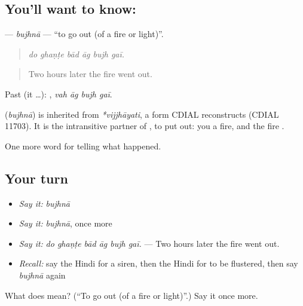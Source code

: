 \subsection*{You'll want to know: }
\textbf{} — \emph{bujhnā} — \textquotedblleft{}to go out (of a fire or light)\textquotedblright{}.

\begin{quote}
     
\end{quote}

\begin{quote}
\emph{do ghaṇṭe bād āg bujh gaī.}
\end{quote}

\begin{quote}
Two hours later the fire went out.
\end{quote}

Past (it …):    , \emph{vah āg bujh gaī}.

\begin{cousinweb}
\textbf{} (\emph{bujhnā}) is inherited from \emph{*vijjhāyati}, a form CDIAL reconstructs (CDIAL 11703). It is the intransitive partner of \textbf{}, to put out: you \textbf{ } a fire, and the fire \textbf{ }.
\end{cousinweb}

\begin{grammarlens}[title={What you've built}]
One more word for telling what happened.
\end{grammarlens}

\subsection*{Your turn}
\begin{itemize}
\raggedright
  \item \emph{Say it:} \emph{bujhnā}
  \item \emph{Say it:} \emph{bujhnā}, once more
  \item \emph{Say it:} \emph{do ghaṇṭe bād āg bujh gaī.} — Two hours later the fire went out.
  \item \emph{Recall:} say the Hindi for a siren, then the Hindi for to be flustered, then say \emph{bujhnā} again
\end{itemize}

\begin{tcolorbox}[breakable,colback=teal!4,colframe=teal!35!black,title={Before you move on}]
What does  mean? (\textquotedblleft{}To go out (of a fire or light)\textquotedblright{}.) Say it once more.
\end{tcolorbox}
